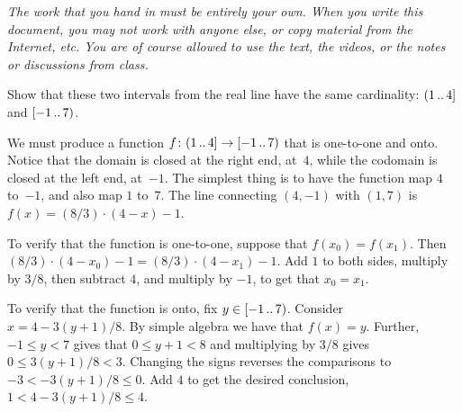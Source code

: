 \documentclass[answers, nolegalese]{examjh}
\begin{document}
\thispagestyle{empty}
\vspace*{1ex}
\begin{center}
 \parbox{0.95\textwidth}{\textit{
  The work that you hand in must be entirely your own. 
  When you write this document, you may not work with anyone else,
  or copy material from the Internet, etc.
  You are of course allowed to use the text, the videos, or the notes
  or discussions from class.
  }}
\end{center}
\vspace*{1ex}
\begin{questions}
\question
Show that these two intervals from the real line have the same cardinality:
$(1\mathinner{{\ldotp}{\ldotp}} 4]$ and $[-1\mathinner{{\ldotp}{\ldotp}} 7)$.
\begin{solution}
We must produce a function $\mbox{$f\colon (1\mathinner{{\ldotp}{\ldotp}} 4]\to [-1\mathinner{{\ldotp}{\ldotp}} 7)$}$ 
that is one-to-one and onto.
Notice that the domain is closed at the right end, at~$4$, while the 
codomain is closed at the left end, at~$-1$.
The simplest thing is to have the function map $4$ to~$-1$, and also 
map $1$ to~$7$.
The line connecting $(4,-1)$ with $(1,7)$
is $f(x)=(8/3)\cdot(4-x)-1$.

To verify that the function is one-to-one, suppose that $f(x_0)=f(x_1)$.
Then $(8/3)\cdot(4-x_0)-1=(8/3)\cdot(4-x_1)-1$.
Add $1$ to both sides, multiply by $3/8$, then subtract $4$, and multiply 
by $-1$, to get that $x_0=x_1$.

To verify that the function is onto, fix $y\in[-1\mathinner{{\ldotp}{\ldotp}} 7)$.
Consider $x=4-3(y+1)/8$.
By simple algebra we have that $f(x)=y$.
Further, $-1\leq y<7$ gives that $0\leq y+1<8$ and multiplying 
by $3/8$ gives $0\leq 3(y+1)/8<3$.
Changing the signs reverses the comparisons to $-3<-3(y+1)/8\leq 0$.
Add $4$ to get the desired conclusion,
$1<4-3(y+1)/8\leq 4$.
\end{solution}

\end{questions}
\end{document}
